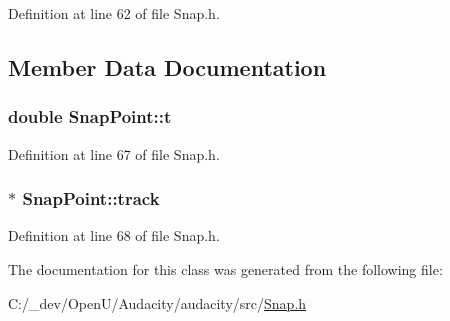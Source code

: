 Definition at line 62 of file Snap.\+h.



\subsection{Member Data Documentation}
\subsubsection[{\texorpdfstring{t}{t}}]{\setlength{\rightskip}{0pt plus 5cm}double Snap\+Point\+::t}\hypertarget{class_snap_point_a429a9ef2d4bfbcd0b991a08287ce844d}{}\label{class_snap_point_a429a9ef2d4bfbcd0b991a08287ce844d}


Definition at line 67 of file Snap.\+h.

\subsubsection[{\texorpdfstring{track}{track}}]{$\ast$ Snap\+Point\+::track}\hypertarget{class_snap_point_aed10d44b35cb487d611de7b45eb8f591}{}\label{class_snap_point_aed10d44b35cb487d611de7b45eb8f591}


Definition at line 68 of file Snap.\+h.



The documentation for this class was generated from the following file\+:\begin{DoxyCompactItemize}
\item 
C\+:/\+\_\+dev/\+Open\+U/\+Audacity/audacity/src/\hyperlink{_snap_8h}{Snap.\+h}\end{DoxyCompactItemize}

